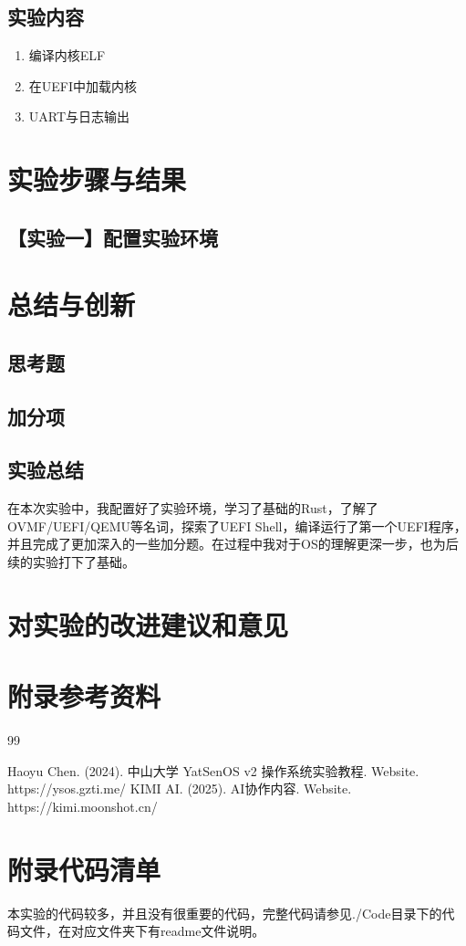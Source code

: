 \documentclass[a4paper]{article}
\begin{document}
\subsection{实验内容}

\begin{enumerate}
    \item 编译内核ELF
    \item 在UEFI中加载内核
    \item UART与日志输出\cite{ref1}
\end{enumerate}

\section{实验步骤与结果}

\subsection{【实验一】配置实验环境}


\section{总结与创新}

\subsection{思考题}


\subsection{加分项}



\subsection{实验总结}

在本次实验中，我配置好了实验环境，学习了基础的Rust，了解了OVMF/UEFI/QEMU等名词，探索了UEFI Shell，编译运行了第一个UEFI程序，并且完成了更加深入的一些加分题。在过程中我对于OS的理解更深一步，也为后续的实验打下了基础。

\section{对实验的改进建议和意见}

\section{附录参考资料}
\begin{thebibliography}{99}  

    Haoyu Chen. (2024). 中山大学 YatSenOS v2 操作系统实验教程. Website. https://ysos.gzti.me/
    KIMI AI. (2025). AI协作内容. Website. https://kimi.moonshot.cn/

\end{thebibliography}

\section{附录代码清单}

本实验的代码较多，并且没有很重要的代码，完整代码请参见./Code目录下的代码文件，在对应文件夹下有readme文件说明。
\end{document}

